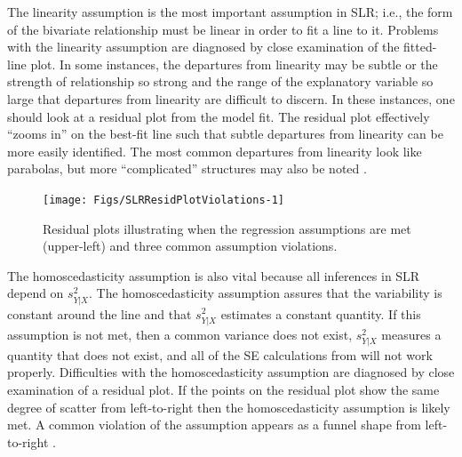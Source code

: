 \documentclass[10pt,openany]{book}\usepackage[]{graphicx}\usepackage[]{color}
\newenvironment{knitrout}{}{} %
\begin{document}
The linearity assumption is the most important assumption in SLR; i.e., the form of the bivariate relationship must be linear in order to fit a line to it.  Problems with the linearity assumption are diagnosed by close examination of the fitted-line plot.  In some instances, the departures from linearity may be subtle or the strength of relationship so strong and the range of the explanatory variable so large that departures from linearity are difficult to discern.  In these instances, one should look at a residual plot from the model fit.  The residual plot effectively ``zooms in'' on the best-fit line such that subtle departures from linearity can be more easily identified.  The most common departures from linearity look like parabolas, but more ``complicated'' structures may also be noted .

\begin{knitrout}
\color{fgcolor}\begin{figure}[h]

{\centering \texttt{[image: Figs/SLRResidPlotViolations-1]} 

}

\caption[Residual plots illustrating when the regression assumptions are met (upper-left) and three common assumption violations]{Residual plots illustrating when the regression assumptions are met (upper-left) and three common assumption violations.}\label{fig:SLRResidPlotViolations}
\end{figure}


\end{knitrout}


\vspace{-12pt}

The homoscedasticity assumption is also vital because all inferences in SLR depend on $s^{2}_{Y|X}$.  The homoscedasticity assumption assures that the variability is constant around the line and that $s^{2}_{Y|X}$ estimates a constant quantity.  If this assumption is not met, then a common variance does not exist, $s^{2}_{Y|X}$ measures a quantity that does not exist, and all of the SE calculations from  will not work properly.  Difficulties with the homoscedasticity assumption are diagnosed by close examination of a residual plot.  If the points on the residual plot show the same degree of scatter from left-to-right then the homoscedasticity assumption is likely met.  A common violation of the assumption appears as a funnel shape from left-to-right .
\end{document}

